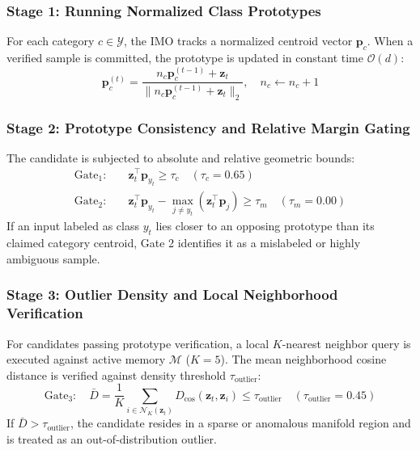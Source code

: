 \documentclass[sn-mathphys,Numbered]{sn-jnl}
\begin{document}
\subsubsection{Stage 1: Running Normalized Class Prototypes}
For each category $c \in \mathcal{Y}$, the IMO tracks a normalized centroid vector $\mathbf{p}_c$. When a verified sample is committed, the prototype is updated in constant time $\mathcal{O}(d)$:
\begin{equation}
\mathbf{p}_c^{(t)} = \frac{n_c \mathbf{p}_c^{(t-1)} + \mathbf{z}_t}{\|n_c \mathbf{p}_c^{(t-1)} + \mathbf{z}_t\|_2}, \quad n_c \leftarrow n_c + 1
\label{eq:proto_update}
\end{equation}

\subsubsection{Stage 2: Prototype Consistency and Relative Margin Gating}
The candidate is subjected to absolute and relative geometric bounds:
\begin{align}
\text{Gate}_1: & \quad \mathbf{z}_t^\top \mathbf{p}_{y_t} \ge \tau_c \quad (\tau_c = 0.65) \label{eq:gate1} \\
\text{Gate}_2: & \quad \mathbf{z}_t^\top \mathbf{p}_{y_t} - \max_{j \ne y_t} \left(\mathbf{z}_t^\top \mathbf{p}_j\right) \ge \tau_m \quad (\tau_m = 0.00) \label{eq:gate2}
\end{align}
If an input labeled as class $y_t$ lies closer to an opposing prototype than its claimed category centroid, Gate 2 identifies it as a mislabeled or highly ambiguous sample.

\subsubsection{Stage 3: Outlier Density and Local Neighborhood Verification}
For candidates passing prototype verification, a local $K$-nearest neighbor query is executed against active memory $\mathcal{M}$ ($K=5$). The mean neighborhood cosine distance is verified against density threshold $\tau_{\text{outlier}}$:
\begin{equation}
\text{Gate}_3: \quad \bar{D} = \frac{1}{K} \sum_{i \in \mathcal{N}_K(\mathbf{z}_t)} D_{\text{cos}}(\mathbf{z}_t, \mathbf{z}_i) \le \tau_{\text{outlier}} \quad (\tau_{\text{outlier}} = 0.45)
\label{eq:gate3}
\end{equation}
If $\bar{D} > \tau_{\text{outlier}}$, the candidate resides in a sparse or anomalous manifold region and is treated as an out-of-distribution outlier.
\end{document}
